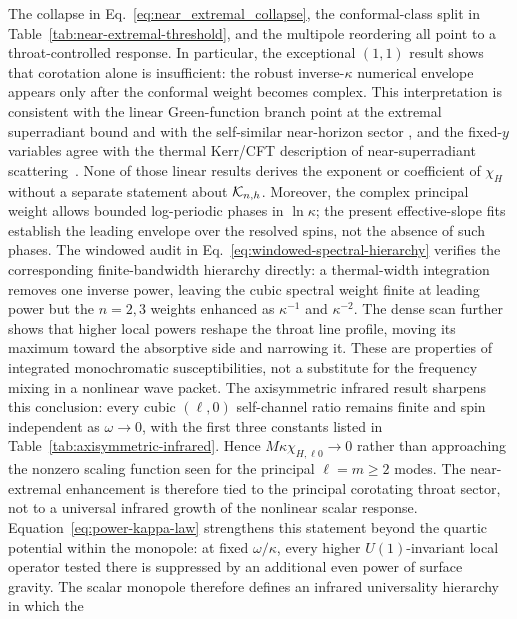 \documentclass[aps,prd,twocolumn,10pt,nofootinbib,superscriptaddress,floatfix]{revtex4-2}
\begin{document}
The collapse in Eq.~\eqref{eq:near_extremal_collapse}, the conformal-class
split in Table~\ref{tab:near-extremal-threshold}, and the multipole reordering
all point to a throat-controlled response.  In particular, the exceptional
$(1,1)$ result shows that corotation alone is insufficient: the robust
inverse-$\kappa$ numerical envelope appears only after the conformal weight
becomes complex.
This interpretation is consistent with the linear Green-function branch point
at the extremal superradiant bound and with the self-similar near-horizon sector
\cite{CasalsGrallaZimmerman2016,CasalsZimmerman2019,
CasalsLongoMicchi2019,GrallaZimmerman2018}, and the fixed-$y$ variables agree
with the thermal Kerr/CFT description of near-superradiant
scattering~\cite{BredbergKerrCFT2010,HartmanKerrCFT2010}.  None of those
linear results derives the exponent or coefficient of $\chi_H$ without a
separate statement about ${\cal K}_{n,h}$.  Moreover, the complex
principal weight allows bounded log-periodic phases in $\ln\kappa$; the
present effective-slope fits establish the leading envelope over the resolved spins,
not the absence of such phases.  The windowed audit in
Eq.~\eqref{eq:windowed-spectral-hierarchy} verifies the corresponding
finite-bandwidth hierarchy directly: a thermal-width integration removes one
inverse power, leaving the cubic spectral weight finite at leading power but
the $n=2,3$ weights enhanced as $\kappa^{-1}$ and $\kappa^{-2}$.  The dense
scan further shows that higher local powers reshape the throat line profile,
moving its maximum toward the absorptive side and narrowing it.  These are
properties of integrated monochromatic susceptibilities, not a substitute for
the frequency mixing in a nonlinear wave packet.
The axisymmetric infrared result sharpens this conclusion: every cubic
$(\ell,0)$ self-channel ratio remains finite and spin independent as
$\omega\to0$, with the first three constants listed in
Table~\ref{tab:axisymmetric-infrared}.  Hence $M\kappa\chi_{H,\ell0}\to0$
rather than approaching the nonzero scaling function seen for the principal
$\ell=m\ge2$ modes.  The near-extremal enhancement is therefore tied to the
principal corotating throat sector, not to a universal infrared growth of the
nonlinear scalar response.  Equation~\eqref{eq:power-kappa-law}
strengthens this statement beyond the quartic potential within the monopole:
at fixed $\omega/\kappa$, every higher $U(1)$-invariant local operator tested
there is suppressed by an additional even power of surface gravity.  The scalar
monopole therefore defines an infrared universality hierarchy in which the
\end{document}
